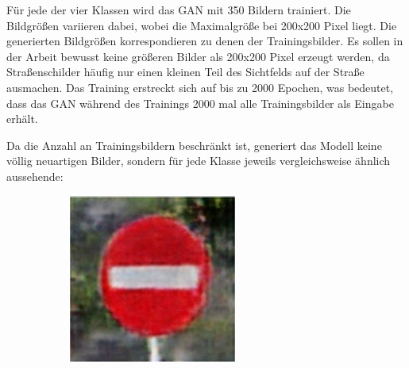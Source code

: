 Für jede der vier Klassen wird das \ac{GAN} mit 350 Bildern trainiert. Die Bildgrößen variieren dabei, wobei die Maximalgröße bei 200x200 Pixel liegt. Die generierten Bildgrößen korrespondieren zu denen der Trainingsbilder. Es sollen in der Arbeit bewusst keine größeren Bilder als 200x200 Pixel erzeugt werden, da Straßenschilder häufig nur einen kleinen Teil des Sichtfelds auf der Straße ausmachen.
Das Training erstreckt sich auf bis zu 2000 Epochen, was bedeutet, dass das \ac{GAN} während des Trainings 2000 mal alle Trainingsbilder als Eingabe erhält. \cite{taiwanGAN}

Da die Anzahl an Trainingsbildern beschränkt ist, generiert das Modell keine völlig neuartigen Bilder, sondern für jede Klasse jeweils vergleichsweise ähnlich aussehende:

\begin{figure}[H]
    \centering
    \captionsetup[subfigure]{labelformat=empty}
    \begin{subfigure}{0.125\textwidth}
        \centering
        \includegraphics[height=\textwidth]{../images/Taiwan Schilder/Generated0.png}
    \end{subfigure}
    \hspace{2em}%
    \begin{subfigure}{0.125\textwidth}
        \centering

\end{subfigure}
\end{figure}
